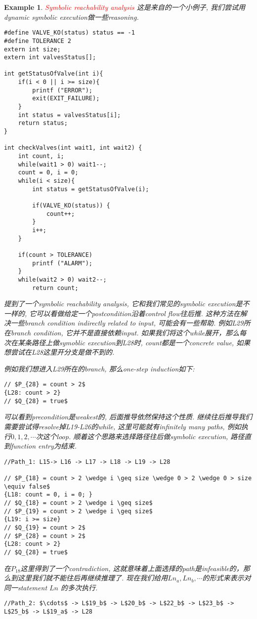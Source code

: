 \documentclass{article}
\newtheorem{example}[theorem]{Example}
\newcommand{\redt}[1]{\textcolor{red}{#1}}
\begin{document}
\begin{example}
\rm \redt{Symbolic reachability analysis} 这是来自\cite{BMGM15}的一个小例子, 我们尝试用dynamic symbolic execution做一些reasoning. 
\begin{verbatim}
#define VALVE_KO(status) status == -1 
#define TOLERANCE 2  
extern int size; 
extern int valvesStatus[];  

int getStatusOfValve(int i){ 
	if(i < 0 || i >= size){ 
		printf ("ERROR"); 
		exit(EXIT_FAILURE); 
	}
	int status = valvesStatus[i]; 
	return status; 
} 

int checkValves(int wait1, int wait2) { 
	int count, i; 
	while(wait1 > 0) wait1--; 
	count = 0, i = 0; 
	while(i < size){ 
		int status = getStatusOfValve(i);
	
		if(VALVE_KO(status)) {
			count++;
		}
		i++;
	}
	
	if(count > TOLERANCE)
		printf ("ALARM");
	}
	while(wait2 > 0) wait2--; 
		return count;
\end{verbatim}
\cite{BMGM15}提到了一个symbolic reachability analysis, 它和我们常见的symbolic execution是不一样的, 它可以看做给定一个postcondition沿着control flow往后推. 这种方法在解决一些branch condition indirectly related to input, 可能会有一些帮助. 例如L29所在branch condition, 它并不是直接依赖input. 如果我们将这个while展开，那么每次在某条路径上做symoblic execution到L28时, count都是一个concrete value, 如果想尝试在L28这里开分支是做不到的.    

例如我们想进入L29所在的branch, 那么one-step induction如下:
\begin{verbatim}
// $P_{28} = count > 2$
{L28: count > 2}
// $Q_{28} = true$
\end{verbatim}
可以看到precondition是weakest的, 后面推导依然保持这个性质. 继续往后推导我们需要尝试得resolve掉L19-L26的while, 这里可能就有infinitely many paths, 例如执行$0,1,2,\cdots$次这个loop. 顺着这个思路来选择路径往后做symbolic execution, 路径直到function entry为结束.
\begin{verbatim}
//Path_1: L15-> L16 -> L17 -> L18 -> L19 -> L28

// $P_{18} = count > 2 \wedge i \geq size \wedge 0 > 2 \wedge 0 > size \equiv false$
{L18: count = 0, i = 0; }
// $Q_{18} = count > 2 \wedge i \geq size$
// $P_{19} = count > 2 \wedge i \geq size$
{L19: i >= size}
// $Q_{19} = count > 2$ 
// $P_{28} = count > 2$
{L28: count > 2}
// $Q_{28} = true$
\end{verbatim}
在$P_{18}$这里得到了一个contradiction, 这就意味着上面选择的path是infeasible的，那么到这里我们就不能往后再继续推理了. 现在我们给用$Ln_{a}, Ln_{b},\cdots$的形式来表示对同一statement $Ln$ 的多次执行.
\begin{verbatim}
//Path_2: $\cdots$ -> L$19_b$ -> L$20_b$ -> L$22_b$ -> L$23_b$ -> L$25_b$ -> L$19_a$ -> L28


\end{verbatim}
\end{example}
\end{document}
